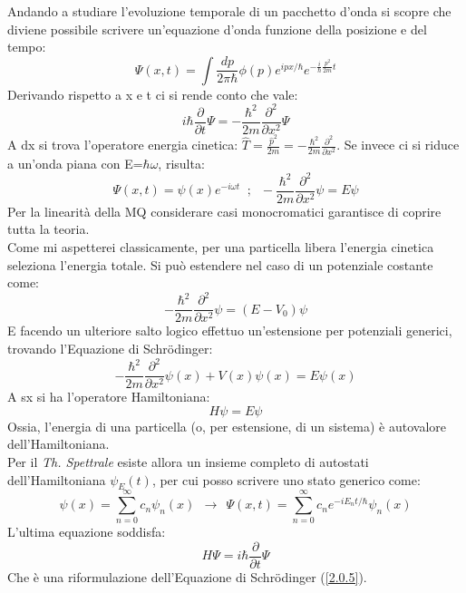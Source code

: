 \documentclass[twoside]{article}
\begin{document}
Andando a studiare l'evoluzione temporale di un pacchetto d'onda si scopre che diviene possibile scrivere un'equazione d'onda funzione della posizione e del tempo:
\begin{equation}
    \Psi(x,t)=\int{\frac{dp}{2\pi \hbar}\phi(p)e^{ipx/\hbar}e^{-\frac{i}{\hbar}\frac{p^2}{2m}t}}
\end{equation}
Derivando rispetto a x e t ci si rende conto che vale:
\begin{equation}
    i\hbar\frac{\partial}{\partial t}\Psi=-\frac{\hbar^2}{2m}\frac{\partial^2}{\partial x ^2}\Psi
\end{equation}
A dx si trova l'operatore energia cinetica: $\hat{T}=\frac{\hat{p}^2}{2m}=-\frac{\hbar^2}{2m}\frac{\partial^2}{\partial x ^2}$.
Se invece ci si riduce a un'onda piana con E=$\hbar \omega$, risulta:
\begin{equation}
    \Psi(x,t)=\psi(x)e^{-i\omega t} \;\;  ; \;\; -\frac{\hbar^2}{2m}\frac{\partial^2}{\partial x ^2}\psi=E\psi
\end{equation}
Per la linearità della MQ considerare casi monocromatici garantisce di coprire tutta la teoria.
\\
Come mi aspetterei classicamente, per una particella libera l'energia cinetica seleziona l'energia totale. Si può estendere nel caso di un potenziale costante come:
\begin{equation}
    -\frac{\hbar^2}{2m}\frac{\partial^2}{\partial x ^2}\psi=(E-V_0)\psi
\end{equation}
E facendo un ulteriore salto logico effettuo un'estensione per potenziali generici, trovando l'Equazione di Schr\"odinger:
\begin{equation} \label{2.0.5}
  -\frac{\hbar^2}{2m}\frac{\partial^2}{\partial x ^2}\psi(x) + V(x)\psi(x)=E\psi(x)
\end{equation}
A sx si ha l'operatore Hamiltoniana:
\begin{equation}
    H\psi=E\psi
\end{equation}
Ossia, l'energia di una particella (o, per estensione, di un sistema) è autovalore dell'Hamiltoniana.
\\
Per il \textit{Th. Spettrale} esiste allora un insieme completo di autostati dell'Hamiltoniana $\psi_E (t)$, per cui posso scrivere uno stato generico come:
\begin{equation}
    \psi (x) =\displaystyle\sum_{n=0}^{\infty} c_n \psi_n (x) \ \ \rightarrow \ \ \Psi(x,t)=\displaystyle\sum_{n=0}^{\infty} c_n e^{-iE_n t/\hbar} \psi_n (x)
\end{equation}
L'ultima equazione soddisfa:
\begin{equation} \label{2.0.8}
    H\Psi=i\hbar \frac{\partial}{\partial t}\Psi
\end{equation}
Che è una riformulazione dell'Equazione di Schr\"odinger (\ref{2.0.5}).
\\
\end{document}
